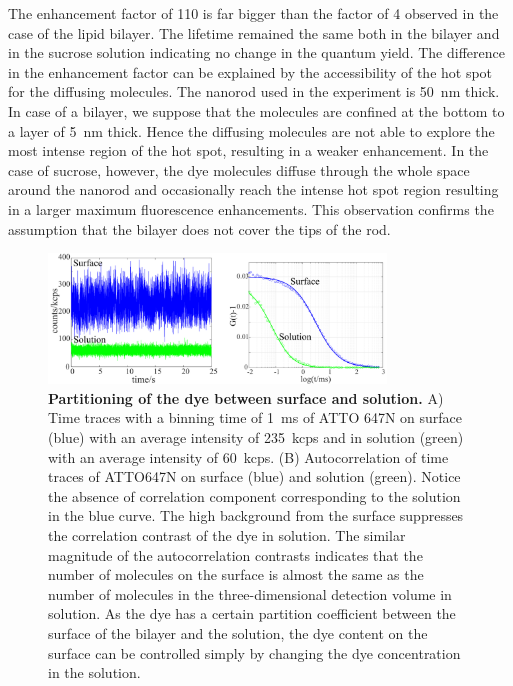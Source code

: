 The enhancement factor of 110 is far bigger than the factor of 4 observed in the case of the lipid bilayer. 
The lifetime remained the same both in the bilayer and in the sucrose solution indicating no change in the quantum yield.
The difference in the enhancement factor can be explained by the accessibility of the hot spot for the diffusing molecules.
The nanorod used in the experiment is \SI{50}{\nm} thick.
In case of a bilayer, we suppose that the molecules are confined at the bottom to a layer of \SI{5}{\nm} thick.
Hence the diffusing molecules are not able to explore the most intense region of the hot spot, resulting in a weaker enhancement.
In the case of sucrose, however, the dye molecules diffuse through the whole space around the nanorod and occasionally reach the intense hot spot region resulting in a larger maximum fluorescence enhancements.
This observation confirms the assumption that the bilayer does not cover the tips of the rod.
\begin{figure}%
  \centering
  \includegraphics[width=0.8\textwidth]{surf_soln}
  \makeatletter
  \renewcommand{\fnum@figure}{\figurename~S\thefigure}
  \makeatother{}
  \caption{\textbf{Partitioning of the dye between surface and solution.} A) Time traces with a binning time of \SI{1}{\ms} of ATTO 647N on surface (blue) with an average intensity of \SI{235}{ kcps} and in solution (green) with an average intensity of \SI{60}{ kcps}.
  (B) Autocorrelation of time traces of ATTO647N on surface (blue) and solution (green).
  Notice the absence of correlation component corresponding to the solution in the blue curve.
  The high background from the surface suppresses the correlation contrast of the dye in solution.
  The similar magnitude of the autocorrelation contrasts indicates that the number of molecules on the surface is almost the same as the number of molecules in the three-dimensional detection volume in solution.
  As the dye has a certain partition coefficient between the surface of the bilayer and the solution, the dye content on the surface can be controlled simply by changing the dye concentration in the solution.}
  \label{SIfig:surf-soln}
\end{figure}